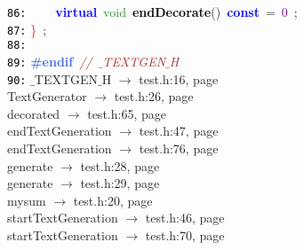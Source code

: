 \documentclass{article}
\begin{document}
\mbox{}\texttt{\textcolor{Black}{86:}} \ \ \ \ \textbf{\textcolor{Blue}{virtual}}\ \textcolor{ForestGreen}{void}\ \textbf{\textcolor{Black}{endDecorate}}\textcolor{BrickRed}{()}\ \textbf{\textcolor{Blue}{const}}\ \textcolor{BrickRed}{=}\ \textcolor{Purple}{0}\ \textcolor{BrickRed}{;} \\
\mbox{}\texttt{\textcolor{Black}{87:}} \textcolor{Red}{\}}\ \textcolor{BrickRed}{;} \\
\mbox{}\texttt{\textcolor{Black}{88:}}  \\
\mbox{}\texttt{\textcolor{Black}{89:}} \textbf{\textcolor{RoyalBlue}{\#endif}}\ \textit{\textcolor{Brown}{//\ $\_$TEXTGEN$\_$H}} \\
\mbox{}\texttt{\textcolor{Black}{90:}} \mbox{}{\hfill $\_$TEXTGEN$\_$H $\rightarrow$ test.h:16, page~\pageref{test.h:16}} \\
\mbox{}{\hfill TextGenerator $\rightarrow$ test.h:26, page~\pageref{test.h:26}} \\
\mbox{}{\hfill decorated $\rightarrow$ test.h:65, page~\pageref{test.h:65}} \\
\mbox{}{\hfill endTextGeneration $\rightarrow$ test.h:47, page~\pageref{test.h:47}} \\
\mbox{}{\hfill endTextGeneration $\rightarrow$ test.h:76, page~\pageref{test.h:76}} \\
\mbox{}{\hfill generate $\rightarrow$ test.h:28, page~\pageref{test.h:28}} \\
\mbox{}{\hfill generate $\rightarrow$ test.h:29, page~\pageref{test.h:29}} \\
\mbox{}{\hfill mysum $\rightarrow$ test.h:20, page~\pageref{test.h:20}} \\
\mbox{}{\hfill startTextGeneration $\rightarrow$ test.h:46, page~\pageref{test.h:46}} \\
\mbox{}{\hfill startTextGeneration $\rightarrow$ test.h:70, page~\pageref{test.h:70}} \\
\end{document}
